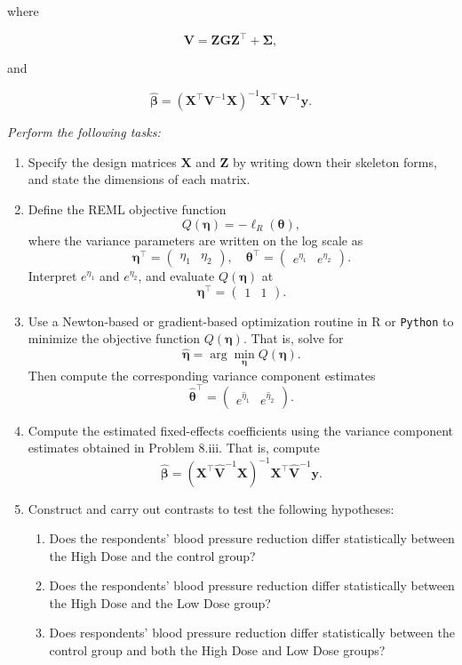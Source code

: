 \documentclass[letterpaper]{article}
\begin{document}
		where
		
		\[
		\mathbf{V} = \mathbf{Z}\mathbf{G}\mathbf{Z}^\top + \boldsymbol{\Sigma},
		\]
		
		and
		
		\[
		\hat{\boldsymbol{\beta}} = (\mathbf{X}^\top \mathbf{V}^{-1} \mathbf{X})^{-1} \mathbf{X}^\top \mathbf{V}^{-1} \mathbf{y}.
		\]
		
		\textit{Perform the following tasks:}
		
		\begin{enumerate}
			\item Specify the design matrices $\mathbf{X}$ and $\mathbf{Z}$ by writing down their skeleton forms, and state the dimensions of each matrix.
			
			\item Define the REML objective function
			\[
			Q(\boldsymbol{\eta}) = -\ell_R(\boldsymbol{\theta}),
			\]
			where the variance parameters are written on the log scale as
			\[
			\boldsymbol{\eta}^\top = \begin{pmatrix} \eta_1 & \eta_2 \end{pmatrix}, \quad \boldsymbol{\theta}^\top = \begin{pmatrix} e^{\eta_1} & e^{\eta_2} \end{pmatrix}.
			\]
			Interpret $e^{\eta_1}$ and $e^{\eta_2}$, and evaluate $Q(\boldsymbol{\eta})$ at
			\[
			\boldsymbol{\eta}^\top = \begin{pmatrix} 1 & 1 \end{pmatrix}.
			\]
			
			\item Use a Newton-based or gradient-based optimization routine in R or \texttt{Python} to minimize the objective function $Q(\boldsymbol{\eta})$. That is, solve for
			\[
			\hat{\boldsymbol{\eta}} = \arg\min_{\boldsymbol{\eta}} Q(\boldsymbol{\eta}).
			\]
			Then compute the corresponding variance component estimates
			\[
			\hat{\boldsymbol{\theta}}^\top = \begin{pmatrix} e^{\hat{\eta}_1} & e^{\hat{\eta}_2} \end{pmatrix}.
			\]
			
			\item Compute the estimated fixed-effects coefficients using the variance component estimates obtained in Problem 8.iii. That is, compute
			\[
			\hat{\boldsymbol{\beta}} = (\mathbf{X}^\top \hat{\mathbf{V}}^{-1} \mathbf{X})^{-1} \mathbf{X}^\top \hat{\mathbf{V}}^{-1} \mathbf{y}.
			\]
			
			\item Construct and carry out contrasts to test the following hypotheses:
			\begin{enumerate}
				\item Does the respondents' blood pressure reduction differ statistically between the High Dose and the control group?
				\item Does the respondents' blood pressure reduction differ statistically between the High Dose and the Low Dose group?
				\item Does respondents' blood pressure reduction differ statistically between the control group and both the High Dose and Low Dose groups?
			\end{enumerate}
		\end{enumerate}
\end{document}

